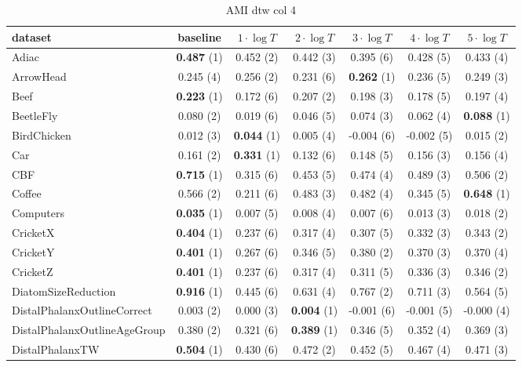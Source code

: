     \begin{table}[ht]
    \caption{AMI dtw col 4} 
    \begin{adjustbox}{width=\textwidth}
    \begin{tabular}{lcccccc}
    \hline
    dataset & baseline & \textbf{$1\cdot \log{T}$} & \textbf{$2\cdot \log{T}$} & \textbf{$3\cdot \log{T}$} & \textbf{$4\cdot \log{T}$} & \textbf{$5\cdot \log{T}$} \\ \hline
    Adiac & \textbf{0.487} (1) & 0.452 (2) & 0.442 (3) & 0.395 (6) & 0.428 (5) & 0.433 (4) \\
    ArrowHead & 0.245 (4) & 0.256 (2) & 0.231 (6) & \textbf{0.262} (1) & 0.236 (5) & 0.249 (3) \\
    Beef & \textbf{0.223} (1) & 0.172 (6) & 0.207 (2) & 0.198 (3) & 0.178 (5) & 0.197 (4) \\
    BeetleFly & 0.080 (2) & 0.019 (6) & 0.046 (5) & 0.074 (3) & 0.062 (4) & \textbf{0.088} (1) \\
    BirdChicken & 0.012 (3) & \textbf{0.044} (1) & 0.005 (4) & -0.004 (6) & -0.002 (5) & 0.015 (2) \\
    Car & 0.161 (2) & \textbf{0.331} (1) & 0.132 (6) & 0.148 (5) & 0.156 (3) & 0.156 (4) \\
    CBF & \textbf{0.715} (1) & 0.315 (6) & 0.453 (5) & 0.474 (4) & 0.489 (3) & 0.506 (2) \\
    Coffee & 0.566 (2) & 0.211 (6) & 0.483 (3) & 0.482 (4) & 0.345 (5) & \textbf{0.648} (1) \\
    Computers & \textbf{0.035} (1) & 0.007 (5) & 0.008 (4) & 0.007 (6) & 0.013 (3) & 0.018 (2) \\
    CricketX & \textbf{0.404} (1) & 0.237 (6) & 0.317 (4) & 0.307 (5) & 0.332 (3) & 0.343 (2) \\
    CricketY & \textbf{0.401} (1) & 0.267 (6) & 0.346 (5) & 0.380 (2) & 0.370 (3) & 0.370 (4) \\
    CricketZ & \textbf{0.401} (1) & 0.237 (6) & 0.317 (4) & 0.311 (5) & 0.336 (3) & 0.346 (2) \\
    DiatomSizeReduction & \textbf{0.916} (1) & 0.445 (6) & 0.631 (4) & 0.767 (2) & 0.711 (3) & 0.564 (5) \\
    DistalPhalanxOutlineCorrect & 0.003 (2) & 0.000 (3) & \textbf{0.004} (1) & -0.001 (6) & -0.001 (5) & -0.000 (4) \\
    DistalPhalanxOutlineAgeGroup & 0.380 (2) & 0.321 (6) & \textbf{0.389} (1) & 0.346 (5) & 0.352 (4) & 0.369 (3) \\
    DistalPhalanxTW & \textbf{0.504} (1) & 0.430 (6) & 0.472 (2) & 0.452 (5) & 0.467 (4) & 0.471 (3) \\

\end{tabular}
\end{adjustbox}
\end{table}

